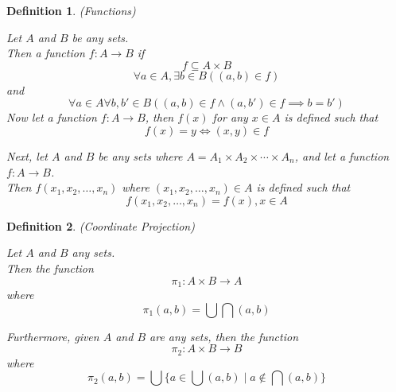\documentclass{article}
\newtheorem{defn}{Definition}[section]
\begin{document}
\begin{defn} (Functions)
	\label{defn:function}
	
	Let \(A\) and \(B\) be any sets. \\
	Then a function \(f : A \to B\) if
	\begin{equation}
		f \subseteq A \times B
	\end{equation}
	\begin{equation}
		\forall a \in A, \exists b \in B((a, b) \in f)
	\end{equation}
	and
	\begin{equation}
		\forall a \in A \forall b, b' \in B((a, b) \in f \land (a, b') \in f \implies b = b')
	\end{equation}
	Now let a function \(f : A \to B\), then \(f(x)\) for any \(x \in A\) is defined such that
	\begin{equation}
		f(x) = y \iff (x, y) \in f
	\end{equation}

	Next, let \(A\) and \(B\) be any sets where \(A = A_{1} \times A_{2} \times \cdots \times A_{n}\), and let 
	a function \(f : A \to B\). \\
	Then \(f(x_{1}, x_{2}, \ldots, x_{n})\) where \((x_{1}, x_{2}, \ldots, x_{n}) \in A\) is defined such that 
	\begin{equation}
		f(x_{1}, x_{2}, \ldots, x_{n}) = f(x), x \in A
	\end{equation}
\end{defn}

\medskip

\begin{defn} (Coordinate Projection)
	\label{defn:coord_projection}
	
	Let \(A\) and \(B\) any sets. \\
	Then the function
	\begin{equation}
		\pi_{1} : A \times B \to A
	\end{equation}
	where
	\begin{equation}
		\pi_{1}(a, b) = \bigcup \bigcap (a, b)
	\end{equation}

	Furthermore, given \(A\) and \(B\) are any sets, then the function
	\begin{equation}
		\pi_{2} : A \times B \to B
	\end{equation}
	where
	\begin{equation}
		\pi_{2}(a, b) = \bigcup\{a \in \bigcup (a, b)\mid a \notin \bigcap(a, b)\}
	\end{equation}
\end{defn}
\end{document}
